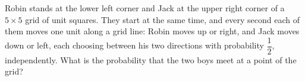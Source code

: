 Robin stands at the lower left corner and Jack at the upper right corner of a $5\times5$ grid of unit squares. They start at the same time, and every second each of them moves one unit along a grid line: Robin moves up or right, and Jack moves down or left, each choosing between his two directions with probability $\dfrac{1}{2}$, independently. What is the probability that the two boys meet at a point of the grid?
